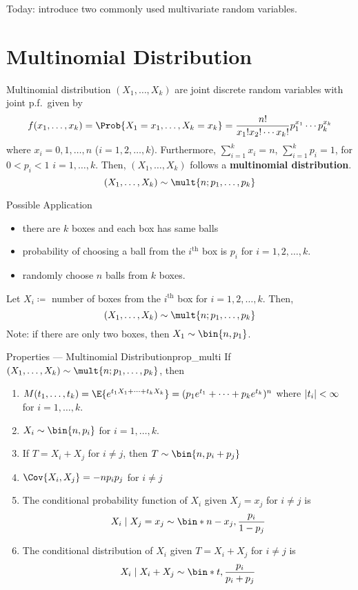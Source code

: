 Today: introduce two commonly
used multivariate random variables.
\section{Multinomial Distribution}
\begin{Definition}{Multinomial distribution}{}
    $ (X_1,\ldots,X_k) $ are joint discrete
    random variables with joint p.f.\ given by
    \[ f(x_1,\ldots,x_k)=\Prob{X_1=x_1,\ldots,X_k=x_k}=
        \frac{n!}{x_1!x_2!\cdots x_k!}p_1^{x_1}\cdots p_k^{x_k} \]
    where $ x_i=0,1,\ldots,n $ ($ i=1,2,\ldots,k $). Furthermore,
    $ \sum_{i=1}^{k}x_i=n $, $ \sum_{i=1}^{k} p_i=1 $,
    for $ 0<p_i<1 $ $ i=1,\ldots,k $. Then,
    $ (X_1,\ldots,X_k) $ follows a \textbf{multinomial distribution}.
    \[ (X_1,\ldots,X_k)\sim \mult{n;p_1,\ldots,p_k} \]
\end{Definition}
\begin{Example}{Possible Application}{}
    \begin{itemize}
        \item there are $ k $ boxes and each box
              has same balls
        \item probability of choosing a ball from the
              $ i^{\text{th}} $ box is $ p_i $ for $ i=1,2,\ldots,k $.
        \item randomly choose $ n $ balls from $ k $ boxes.
    \end{itemize}
    Let $ X_i\coloneq $ number of boxes from the
    $ i^{\text{th}} $ box for $ i=1,2,\ldots,k $. Then,
    \[ (X_1,\ldots,X_k) \sim \mult{n;p_1,\ldots,p_k} \]
    Note: if there are only two boxes, then $ X_1\sim \bin{n,p_1} $.
\end{Example}
\begin{Proposition}{Properties --- Multinomial Distribution}{prop_multi}
    If $ (X_1,\ldots,X_k) \sim \mult{n;p_1,\ldots,p_k} $, then
    \begin{enumerate}[label=(\arabic*)]
        \item\label{prop_multi1} $ M(t_1,\ldots,t_k)=\E{e^{t_1 X_1+\cdots+t_k X_k}}=
                  (p_1e^{t_1}+\cdots+p_k e^{t_k})^n $
              where $ \lvert t_i\rvert<\infty $ for $ i=1,\ldots,k $.
        \item\label{prop_multi2} $ X_i \sim \bin{n,p_i} $ for $ i=1,\ldots,k $.
        \item\label{prop_multi3} If $ T=X_i+X_j $ for $ i\neq j $, then
              $ T \sim \bin{n,p_i+p_j} $
        \item\label{prop_multi4} $ \Cov{X_i,X_j}=-n p_i p_j  $
              for $ i\neq j $
        \item\label{prop_multi5} The conditional probability
              function of $ X_i $ given $ X_j=x_j $ for $ i\neq j $ is
              \[ X_i\mid X_j=x_j \sim \bin*{n-x_j,
                      \frac{p_i}{1-p_j}} \]
        \item\label{prop_multi6} The conditional distribution of $ X_i $
              given $ T=X_i+X_j $ for $ i\neq j $ is
              \[ X_i\mid X_i+X_j \sim \bin*{t,\frac{p_i}{p_i+p_j} } \]
    \end{enumerate}
\end{Proposition}
